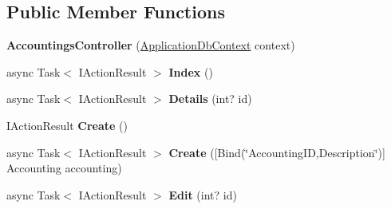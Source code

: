 \subsection*{Public Member Functions}
\begin{DoxyCompactItemize}
\item 
\mbox{\label{class_projeto_e_s_w_1_1_controllers_1_1_accountings_controller_aaa00d8e16116e3779f06090a0a81bb80}} 
{\bfseries Accountings\+Controller} (\mbox{\hyperlink{class_projeto_e_s_w_1_1_data_1_1_application_db_context}{Application\+Db\+Context}} context)
\item 
\mbox{\label{class_projeto_e_s_w_1_1_controllers_1_1_accountings_controller_adc529b34d4981c94d12e4a086dcb5e3b}} 
async Task$<$ I\+Action\+Result $>$ {\bfseries Index} ()
\item 
\mbox{\label{class_projeto_e_s_w_1_1_controllers_1_1_accountings_controller_a19196092d52f77e367dfff4856f777c6}} 
async Task$<$ I\+Action\+Result $>$ {\bfseries Details} (int? id)
\item 
\mbox{\label{class_projeto_e_s_w_1_1_controllers_1_1_accountings_controller_a31d777229170aaa4112518c0ed8a0690}} 
I\+Action\+Result {\bfseries Create} ()
\item 
\mbox{\label{class_projeto_e_s_w_1_1_controllers_1_1_accountings_controller_aee3b52e641d39962c67cdaf00f96b354}} 
async Task$<$ I\+Action\+Result $>$ {\bfseries Create} (\mbox{[}Bind(\char`\"{}Accounting\+ID,Description\char`\"{})\mbox{]} Accounting accounting)
\item 
\mbox{\label{class_projeto_e_s_w_1_1_controllers_1_1_accountings_controller_a20756f122a48a23d53ce26e751e15e7b}} 
async Task$<$ I\+Action\+Result $>$ {\bfseries Edit} (int? id)
\item 
\mbox{\label{class_projeto_e_s_w_1_1_controllers_1_1_accountings_controller_ab89875939cf4dd40f4ac938f577bc817}} 

\end{DoxyCompactItemize}

